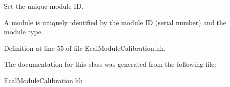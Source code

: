 Set the unique module I\-D. 

A module is uniquely identified by the module I\-D (serial number) and the module type. 

Definition at line 55 of file Ecal\-Module\-Calibration.\-hh.



The documentation for this class was generated from the following file\-:\begin{DoxyCompactItemize}
\item 
Ecal\-Module\-Calibration.\-hh\end{DoxyCompactItemize}
